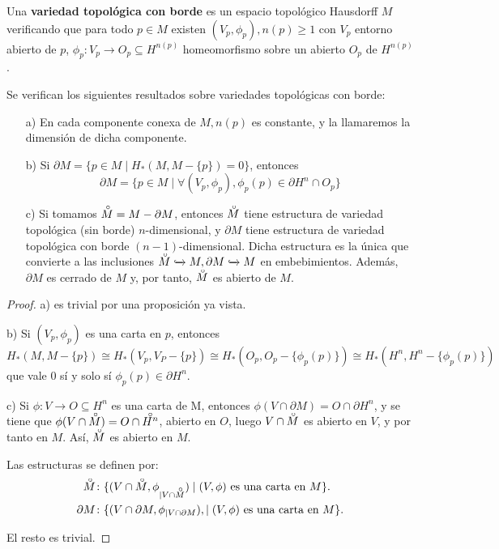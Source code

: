 \begin{definition}
  Una \textbf{variedad topológica con borde} es un espacio topológico Hausdorff $M$ verificando que para todo $p \in M$ existen
  $(V_p, \phi_p), n(p) \geq 1$ con $V_p$ entorno abierto de $p$, $\phi_p \colon V_p \to O_p \subseteq H^{n(p)}$ homeomorfismo
  sobre un abierto $O_p$ de $H^{n(p)}$.
\end{definition}

\begin{proposition}[Consecuencias]
  Se verifican los siguientes resultados sobre variedades topológicas con borde:
  \begin{itemize}
    \item[a)] En cada componente conexa de $M, n(p)$ es constante, y la llamaremos la dimensión de dicha componente.

    \item[b)] Si $\partial M = \{p \in M \mid H_*(M, M - \{p\}) = 0\}$, entonces
    \[ \partial M = \{p \in M \mid \forall (V_p, \phi_p), \phi_p(p) \in \partial H^n \cap O_p\} \]

    \item[c)] Si tomamos $\interior{M} = M - \partial M$, entonces $\interior{M}$ tiene estructura de variedad topológica
    (sin borde) $n$-dimensional, y $\partial M$ tiene estructura de variedad topológica con borde $(n-1)$-dimensional.
    Dicha estructura es la única que convierte a las inclusiones $\interior{M} \xhookrightarrow{} M, \partial M \xhookrightarrow{} M$
    en embebimientos. Además, $\partial M$ es cerrado de $M$ y, por tanto, $\interior{M}$ es abierto de $M$.
  \end{itemize}
\end{proposition}

\begin{proof}
  a) es trivial por una proposición ya vista.

  b) Si $(V_p, \phi_p)$ es una carta en $p$, entonces
  \[ H_*(M, M - \{p\}) \cong H_*(V_p, V_P - \{p\}) \cong H_*(O_p, O_p - \{\phi_p(p)\}) \cong H_*(H^n, H^n - \{\phi_p(p)\}) \]
  que vale $0$ sí y solo sí $\phi_p(p) \in \partial H^n$.

  c) Si $\phi \colon V \to O \subseteq H^n$ es una carta de M, entonces $\phi(V \cap \partial M) = O \cap \partial H^n$, y se tiene que
  $\phi(V \cap \interior{M}) = O \cap \interior{H^n}$, abierto en $O$, luego $V \cap \interior{M}$ es abierto en $V$, y por tanto en $M$.
  Así, $\interior{M}$ es abierto en $M$.

  Las estructuras se definen por:
  \begin{align*}
    \interior{M} &\colon \{(V \cap \interior{M}, \phi_{|V \cap \interior{M}}) \mid (V, \phi) \text{ es una carta en }M\}. \\
    \partial M &\colon   \{(V \cap \partial M,  \phi_{|V \cap \partial M}), \mid (V, \phi) \text{ es una carta en }M\}.
  \end{align*}

  El resto es trivial.
\end{proof}

